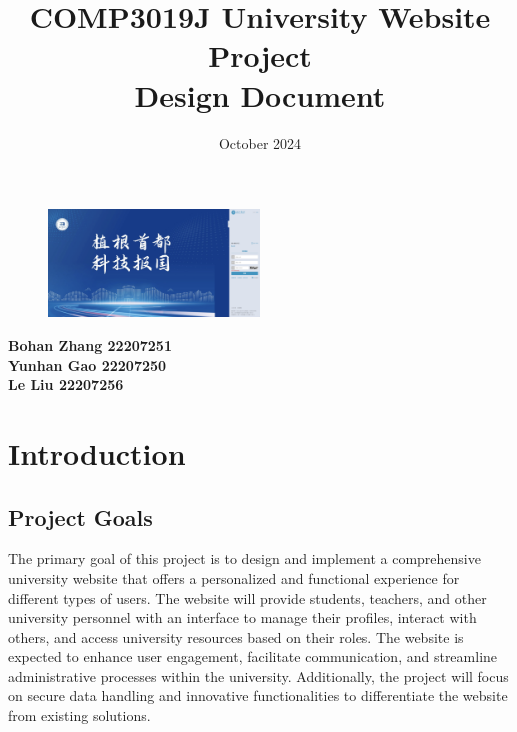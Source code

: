 \documentclass[12pt]{article}
\title{COMP3019J University Website Project\\ \Large Design Document}
\date{October 2024}
\begin{document}
\maketitle
\vspace{2cm}
\begin{figure}[h]  %
  \centering
  \includegraphics[width=0.5\textwidth]{title.png}  %
\end{figure}
\vspace{6cm}

\begin{center}
  \textbf{Bohan Zhang 22207251}\\
  \textbf{Yunhan Gao 22207250}\\
  \textbf{Le Liu 22207256}\\
\end{center}

\thispagestyle{empty}
\newpage

\tableofcontents
\newpage


\section{Introduction}

\subsection{Project Goals}
The primary goal of this project is to design and implement a comprehensive university website that offers a personalized
 and functional experience for different types of users. The website will provide students, teachers, and other university 
 personnel with an interface to manage their profiles, interact with others, and access university resources based on their 
 roles. The website is expected to enhance user engagement, facilitate communication, and streamline administrative processes 
 within the university. Additionally, the project will focus on secure data handling and innovative functionalities to 
 differentiate the website from existing solutions.
\end{document}
